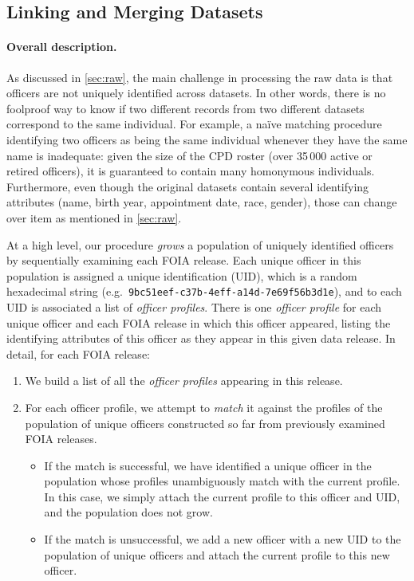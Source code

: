\subsection{Linking and Merging Datasets}\label{sec:linking}

\paragraph{Overall description.}

As discussed in \cref{sec:raw}, the main challenge in processing the raw data
is that officers are not uniquely identified across datasets. In other words,
there is no foolproof way to know if two different records from two different
datasets correspond to the same individual. For example, a na\"ive matching
procedure identifying two officers as being the same individual whenever they
have the same name is inadequate: given the size of the CPD roster (over 35\,000
active or retired officers), it is guaranteed to contain many homonymous
individuals. Furthermore, even though the original datasets contain several
identifying attributes (name, birth year, appointment date, race, gender),
those can change over item as mentioned in \cref{sec:raw}.

At a high level, our procedure \emph{grows} a population of uniquely identified
officers by sequentially examining each FOIA release. Each unique officer in
this population is assigned a unique identification (UID), which is a random
hexadecimal string (e.g.\ \texttt{9bc51eef-c37b-4eff-a14d-7e69f56b3d1e}), and
to each UID is associated a list of \emph{officer profiles}. There is one
\emph{officer profile} for each unique officer and each FOIA release in which
this officer appeared, listing the identifying attributes of this officer as
they appear in this given data release. In detail, for each FOIA release:
\begin{enumerate}
	\item We build a list of all the \emph{officer profiles} appearing in this
		release.
	\item For each officer profile, we attempt to \emph{match} it against the
		profiles of the population of unique officers constructed so far from
		previously examined FOIA releases.
		\begin{itemize}
			\item If the match is successful, we have identified a unique officer in
				the population whose profiles unambiguously match with the
				current profile. In this case, we simply attach the current
				profile to this officer and UID, and
				the population does not grow.
			\item If the match is unsuccessful, we add a new officer with a new UID to the population of unique
				officers and attach the current profile to this new officer.
		\end{itemize}
\end{enumerate}

